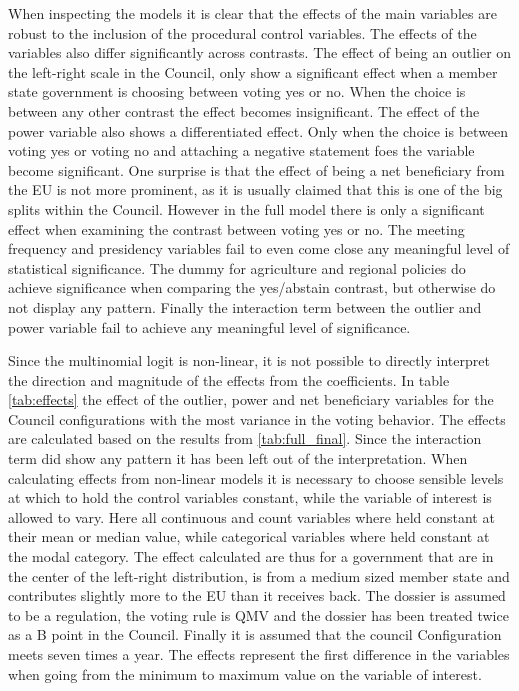 When inspecting the models it is clear that the effects of the main variables are robust to the inclusion of the procedural control variables. The effects of the variables also differ significantly across contrasts. The effect of being an outlier on the left-right scale in the Council, only show a significant effect when a member state government is choosing between voting yes or no. When the choice is between any other contrast the effect becomes insignificant. The effect of the power variable also shows a differentiated effect. Only when the choice is between voting yes or voting no and attaching a negative statement foes the variable become significant. One surprise is that the effect of being a net beneficiary from the EU is not more prominent, as it is usually claimed that this is one of the big splits within the Council. However in the full model there is only a significant effect when examining the contrast between voting yes or no. The meeting frequency and presidency variables fail to even come close any meaningful level of statistical significance. The dummy for agriculture and regional policies do achieve significance when comparing the yes/abstain contrast, but otherwise do not display any pattern. Finally the interaction term between the outlier and power variable fail to achieve any meaningful level of significance.

 Since the multinomial logit is non-linear, it is not possible to directly interpret the direction and magnitude of the effects from the coefficients. In table \ref{tab:effects} the effect of the outlier, power and net beneficiary variables for the Council  configurations with the most variance in the voting behavior. The effects are calculated based on the results from \ref{tab:full_final}. Since the interaction term did show any pattern it  has been left out of the interpretation. When calculating effects from non-linear models it is necessary to choose sensible levels at which to hold the control variables constant, while the variable of interest is allowed to vary. Here all continuous and count variables where held constant at their mean or median value, while categorical variables where held constant at the modal category. The effect calculated are thus for a government that are in the center of the left-right distribution, is from a medium sized member state and contributes slightly more to the EU than it receives back. The dossier is assumed to be a regulation, the voting rule is QMV and the dossier has been treated twice as a B point in the Council. Finally it is assumed that the council Configuration meets seven times a year. The effects represent the first difference in the variables when going from the minimum to maximum value on the variable of interest.

